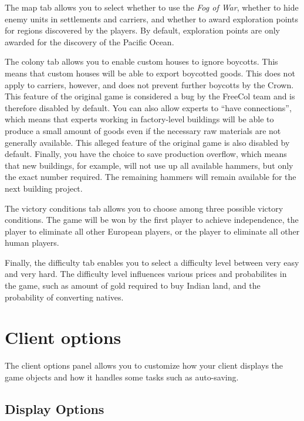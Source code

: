 \documentclass[12pt]{book}
\begin{document}
The map tab allows you to select whether to use the \textit{Fog of
  War}, whether to hide enemy units in settlements and carriers, and
whether to award exploration points for regions discovered by the
players. By default, exploration points are only awarded for the
discovery of the Pacific Ocean.

The colony tab allows you to enable custom houses to ignore
boycotts. This means that custom houses will be able to export
boycotted goods. This does not apply to carriers, however, and does
not prevent further boycotts by the Crown. This feature of the
original game is considered a bug by the FreeCol team and is therefore
disabled by default. You can also allow experts to ``have
connections'', which means that experts working in factory-level
buildings will be able to produce a small amount of goods even if the
necessary raw materials are not generally available. This alleged
feature of the original game is also disabled by default. Finally, you
have the choice to save production overflow, which means that new
buildings, for example, will not use up all available hammers, but
only the exact number required. The remaining hammers will remain
available for the next building project.

The victory conditions tab allows you to choose among three possible
victory conditions. The game will be won by the first player to
achieve independence, the player to eliminate all other European
players, or the player to eliminate all other human players.

Finally, the difficulty tab enables you to select a difficulty level
between very easy and very hard. The difficulty level influences
various prices and probabilites in the game, such as amount of gold
required to buy Indian land, and the probability of converting
natives.


\hypertarget{Client options}{\section{Client options}}

The client options panel allows you to customize how your client
displays the game objects and how it handles some tasks such as
auto-saving.

\hypertarget{display options}{\subsection{Display Options}}
\end{document}
